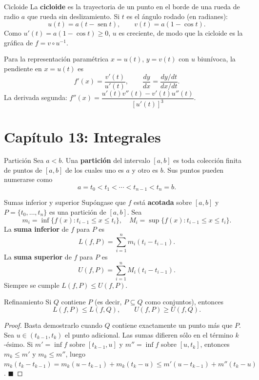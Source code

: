 \documentclass[12pt]{article}
\begin{document}
\begin{definicion}[]{Cicloide}
La \textbf{cicloide} es la trayectoria de un punto en el borde de una rueda de radio $a$ que rueda sin deslizamiento. Si $t$ es el ángulo rodado (en radianes):
\[ u(t) = a(t - \operatorname{sen} t), \qquad v(t) = a(1 - \cos t). \]
Como $u'(t) = a(1-\cos t) \geq 0$, $u$ es creciente, de modo que la cicloide es la gráfica de $f = v \circ u^{-1}$.
\end{definicion}

\begin{nota}[]{}
Para la representación paramétrica $x=u(t)$, $y=v(t)$ con $u$ biunívoca, la pendiente en $x=u(t)$ es
\[ f'(x) = \frac{v'(t)}{u'(t)}, \qquad \frac{dy}{dx} = \frac{dy/dt}{dx/dt}. \]
La derivada segunda: $f''(x) = \dfrac{u'(t)v''(t) - v'(t)u''(t)}{[u'(t)]^3}$.
\end{nota}

\section{Capítulo 13: Integrales}

\begin{definicion}[]{Partición}
Sea $a < b$. Una \textbf{partición} del intervalo $[a, b]$ es toda colección finita de puntos de $[a, b]$ de los cuales uno es $a$ y otro es $b$. Sus puntos pueden numerarse como
\[ a = t_0 < t_1 < \cdots < t_{n-1} < t_n = b. \]
\end{definicion}

\begin{definicion}[]{Sumas inferior y superior}
Supóngase que $f$ está \textbf{acotada} sobre $[a, b]$ y $P = \{t_0, \ldots, t_n\}$ es una partición de $[a, b]$. Sea
\[ m_i = \inf\{f(x) : t_{i-1} \leq x \leq t_i\}, \quad M_i = \sup\{f(x) : t_{i-1} \leq x \leq t_i\}. \]
La \textbf{suma inferior} de $f$ para $P$ es
\[ L(f, P) = \sum_{i=1}^n m_i(t_i - t_{i-1}). \]
La \textbf{suma superior} de $f$ para $P$ es
\[ U(f, P) = \sum_{i=1}^n M_i(t_i - t_{i-1}). \]
Siempre se cumple $L(f, P) \leq U(f, P)$.
\end{definicion}

\begin{lema}[]{Refinamiento}
Si $Q$ contiene $P$ (es decir, $P \subseteq Q$ como conjuntos), entonces
\[ L(f, P) \leq L(f, Q), \qquad U(f, P) \geq U(f, Q). \]
\end{lema}

\begin{proof}
Basta demostrarlo cuando $Q$ contiene exactamente un punto más que $P$. Sea $u \in (t_{k-1}, t_k)$ el punto adicional. Las sumas difieren sólo en el término $k$-ésimo. Si $m' = \inf f$ sobre $[t_{k-1}, u]$ y $m'' = \inf f$ sobre $[u, t_k]$, entonces $m_k \leq m'$ y $m_k \leq m''$, luego $m_k(t_k-t_{k-1}) = m_k(u-t_{k-1})+m_k(t_k-u) \leq m'(u-t_{k-1})+m''(t_k-u)$.
$\blacksquare$
\end{proof}
\end{document}
